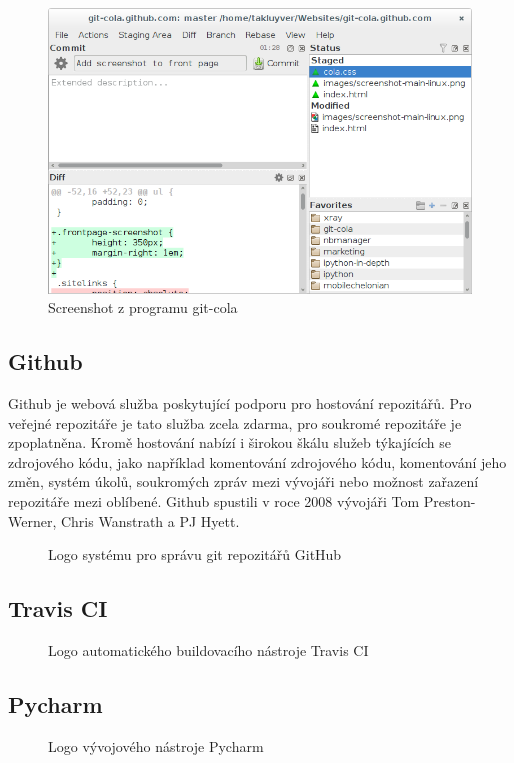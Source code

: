 \begin{figure}[H]
 \centering
 \includegraphics[width=\textwidth]{images/git-cola-screenshot}
 \caption{Screenshot z programu git-cola}
\end{figure}

\subsection{Github}

Github je webová služba poskytující podporu pro hostování  repozitářů. Pro veřejné repozitáře je tato služba zcela zdarma, pro soukromé repozitáře je zpoplatněna. Kromě hostování nabízí i širokou škálu služeb týkajících se zdrojového kódu, jako například komentování zdrojového k\'{o}du, komentování jeho změn, systém úkolů, soukromých zpráv mezi vývojáři nebo možnost zařazení repozitáře mezi oblíbené. Github spustili v roce 2008 vývojáři Tom Preston-Werner, Chris Wanstrath a PJ Hyett.

\begin{figure}[H]
 \centering
 
 \caption{Logo systému pro správu git repozitářů GitHub}
\end{figure}

\subsection{Travis CI}

\begin{figure}[H]
 \centering
 
 \caption{Logo automatického buildovacího nástroje Travis CI}
\end{figure}


\subsection{Pycharm}

\begin{figure}[H]
 \centering
 
 \caption{Logo vývojového nástroje Pycharm}
\end{figure}

